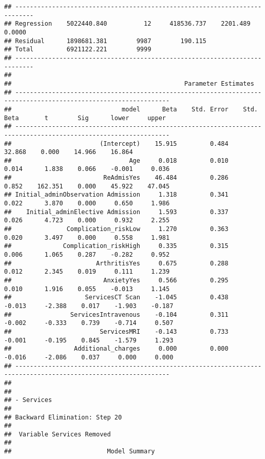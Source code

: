 \documentclass[
]{article}
\begin{document}
\begin{verbatim}
## ---------------------------------------------------------------------------
## Regression    5022440.840          12     418536.737    2201.489    0.0000 
## Residual      1898681.381        9987        190.115                       
## Total         6921122.221        9999                                      
## ---------------------------------------------------------------------------
## 
##                                               Parameter Estimates                                                
## ----------------------------------------------------------------------------------------------------------------
##                              model      Beta    Std. Error    Std. Beta       t        Sig      lower     upper 
## ----------------------------------------------------------------------------------------------------------------
##                        (Intercept)    15.915         0.484                  32.868    0.000    14.966    16.864 
##                                Age     0.018         0.010        0.014      1.838    0.066    -0.001     0.036 
##                         ReAdmisYes    46.484         0.286        0.852    162.351    0.000    45.922    47.045 
## Initial_adminObservation Admission     1.318         0.341        0.022      3.870    0.000     0.650     1.986 
##    Initial_adminElective Admission     1.593         0.337        0.026      4.723    0.000     0.932     2.255 
##               Complication_riskLow     1.270         0.363        0.020      3.497    0.000     0.558     1.981 
##              Complication_riskHigh     0.335         0.315        0.006      1.065    0.287    -0.282     0.952 
##                       ArthritisYes     0.675         0.288        0.012      2.345    0.019     0.111     1.239 
##                         AnxietyYes     0.566         0.295        0.010      1.916    0.055    -0.013     1.145 
##                    ServicesCT Scan    -1.045         0.438       -0.013     -2.388    0.017    -1.903    -0.187 
##                ServicesIntravenous    -0.104         0.311       -0.002     -0.333    0.739    -0.714     0.507 
##                        ServicesMRI    -0.143         0.733       -0.001     -0.195    0.845    -1.579     1.293 
##                 Additional_charges     0.000         0.000       -0.016     -2.086    0.037     0.000     0.000 
## ----------------------------------------------------------------------------------------------------------------
## 
## 
## - Services 
## 
## Backward Elimination: Step 20 
## 
##  Variable Services Removed 
## 
##                          Model Summary                          

\end{verbatim}
\end{document}
